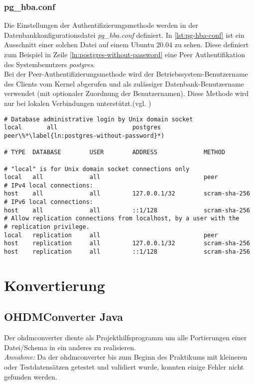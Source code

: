 \newpage
\subsection{pg\_hba.conf}
Die Einstellungen der Authentifizierungsmethode werden in der Datenbankkonfigurationsdatei \textit{pg\_hba.conf} definiert. In \autoref{lst:pg-hba-conf} ist ein Ausschnitt einer solchen Datei auf einem Ubuntu 20.04 zu sehen. Diese definiert zum Beispiel in Zeile \ref{ln:postgres-without-password} eine Peer Authentifikation des Systembenutzers \textit{postgres}.\\
Bei der Peer-Authentifizierungsmethode wird der Betriebssystem-Benutzername des Clients vom Kernel abgerufen und als zulässiger Datenbank-Benutzername verwendet (mit optionaler Zuordnung der Benutzernamen). Diese Methode wird nur bei lokalen Verbindungen unterstützt.(vgl. \autocite{peer-authentification})
\begin{lstlisting}[caption={pg\_hba.conf Ausschnitt},label={lst:pg-hba-conf},deletekeywords={all}]
# Database administrative login by Unix domain socket
local		all				 		postgres	       					     peer\%*\label{ln:postgres-without-password}*)

# TYPE  DATABASE    	USER        ADDRESS             METHOD

# "local" is for Unix domain socket connections only
local   all         	all                             peer
# IPv4 local connections:
host    all         	all         127.0.0.1/32        scram-sha-256
# IPv6 local connections:
host    all         	all         ::1/128             scram-sha-256
# Allow replication connections from localhost, by a user with the
# replication privilege.
local   replication 	all                             peer
host    replication 	all         127.0.0.1/32        scram-sha-256
host    replication 	all         ::1/128             scram-sha-256
\end{lstlisting}

\chapter{Konvertierung}
\section{OHDMConverter Java}
Der \gls{ohdmconverter} diente als Projekthilfsprogramm um alle Portierungen einer Datei/Schema in ein anderes zu realisieren.\\
\textit{Annahme:} Da der \gls{ohdmconverter} bis zum Beginn des Praktikums  mit kleineren oder Testdatensätzen getestet und validiert wurde, konnten einige Fehler nicht gefunden werden.


